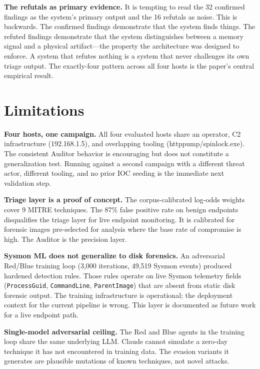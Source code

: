 \documentclass[sigconf, nonacm]{acmart}
\begin{document}
\textbf{The refutals as primary evidence.}
It is tempting to read the 32 confirmed findings as the system's primary output
and the 16 refutals as noise. This is backwards. The confirmed findings
demonstrate that the system finds things. The refuted findings demonstrate that
the system distinguishes between a memory signal and a physical artifact---the
property the architecture was designed to enforce. A system that refutes nothing
is a system that never challenges its own triage output. The exactly-four pattern
across all four hosts is the paper's central empirical result.

\section{Limitations}
\label{sec:limitations}

\textbf{Four hosts, one campaign.} All four evaluated hosts share an operator,
C2 infrastructure (192.168.1.5), and overlapping tooling (httppump/spinlock.exe).
The consistent Auditor behavior is encouraging but does not constitute a
generalization test. Running against a second campaign with a different threat
actor, different tooling, and no prior IOC seeding is the immediate next
validation step.

\textbf{Triage layer is a proof of concept.} The corpus-calibrated log-odds
weights cover 9 MITRE techniques. The 87\% false positive rate on benign
endpoints disqualifies the triage layer for live endpoint monitoring. It is
calibrated for forensic images pre-selected for analysis where the base rate of
compromise is high. The Auditor is the precision layer.

\textbf{Sysmon ML does not generalize to disk forensics.} An adversarial
Red/Blue training loop (3,000 iterations, 49,519 Sysmon events) produced
hardened detection rules. Those rules operate on live Sysmon telemetry fields
(\texttt{ProcessGuid}, \texttt{CommandLine}, \texttt{ParentImage}) that are
absent from static disk forensic output. The training infrastructure is
operational; the deployment context for the current pipeline is wrong. This
layer is documented as future work for a live endpoint path.

\textbf{Single-model adversarial ceiling.} The Red and Blue agents in the
training loop share the same underlying LLM. Claude cannot simulate a
zero-day technique it has not encountered in training data. The evasion variants
it generates are plausible mutations of known techniques, not novel attacks.
\end{document}
